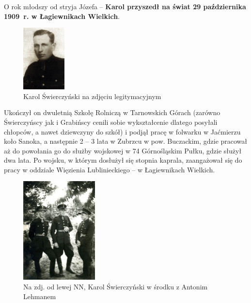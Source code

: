 O rok młodszy od stryja Józefa -- \textbf{Karol przyszedł na świat 29 października 1909~r. w Łagiewnikach Wielkich}.

\begin{figure}[!h]
\begin{center}
\includegraphics[width=0.2\textwidth]{photo/karol_swierczynski_1.jpg}
\caption{Karol Świerczyński na zdjęciu legitymacyjnym}
\label{rys:karol_swierczynski_1}
\end{center}
\end{figure}

Ukończył on dwuletnią Szkołę Rolniczą w Tarnowskich Górach (zarówno Świerczyńscy jak i Grabińscy cenili sobie wykształcenie dlatego posyłali chłopców, a nawet dziewczyny do szkół) i podjął pracę w folwarku w Jaćmierzu koło Sanoka, a następnie 2 -- 3 lata w Zubrzcu w pow. Buczackim, gdzie pracował aż do powołania go do służby wojskowej w 74 Górnośląskim Pułku, gdzie służył dwa lata. Po wojsku, w którym dosłużył się stopnia kaprala, zaangażował się do pracy w oddziale Więzienia Lublinieckiego -- w Łagiewnikach Wielkich.

\begin{figure}[!h]
\begin{center}
\includegraphics[width=0.35\textwidth]{photo/karol_swierczynski_2.jpg}
\caption[Karol Świerczyński z Antonim Lehmanem]{Na zdj. od lewej NN, Karol Świerczyński w środku z Antonim Lehmanem}
\label{rys:karol_swierczynski_2}
\end{center}
\end{figure}

